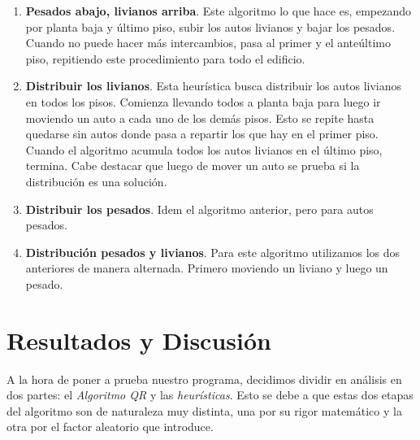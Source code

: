 \documentclass[a4paper]{article}
\begin{document}
\begin{enumerate}
  \item \textbf{Pesados abajo, livianos arriba}. Este algoritmo lo que hace es, empezando por planta baja y último piso, subir los autos livianos y bajar los pesados. Cuando no puede hacer más intercambios, pasa al primer y el anteúltimo piso, repitiendo este procedimiento para todo el edificio.
  \item \textbf{Distribuir los livianos}. Esta heurística busca distribuir los autos livianos en todos los pisos. Comienza llevando todos a planta baja para luego ir moviendo un auto a cada uno de los demás pisos. Esto se repite hasta quedarse sin autos donde pasa a repartir los que hay en el primer piso. Cuando el algoritmo acumula todos los autos livianos en el último piso, termina. Cabe destacar que luego de mover un auto se prueba si la distribución es una solución.
  \item \textbf{Distribuir los pesados}. Idem el algoritmo anterior, pero para autos pesados.
  \item \textbf{Distribución pesados y livianos}. Para este algoritmo utilizamos los dos anteriores de manera alternada. Primero moviendo un liviano y luego un pesado.
\end{enumerate}


\newpage

\section{Resultados y Discusión}

A la hora de poner a prueba nuestro programa, decidimos dividir en análisis en dos partes: el \textit{Algoritmo QR} y las \textit{heurísticas}. Esto se debe a que estas dos etapas del algoritmo son de naturaleza muy distinta, una por su rigor matemático y la otra por el factor  aleatorio que introduce.
\end{document}
